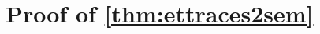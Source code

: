 \section{Proof of \cref{thm:ettraces2sem}}
\label{app:compositionality}
\label{app:exec-test-and-traces}
%
%

%
%
%
